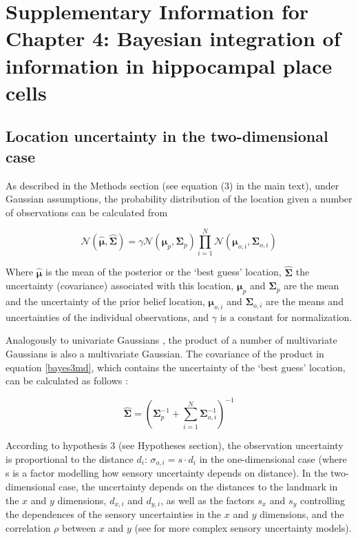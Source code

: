 \chapter{Supplementary Information for Chapter 4: Bayesian integration of information in hippocampal place cells}
\label{apx:bayespc}

\section{Location uncertainty in the two-dimensional case}

As described in the Methods section (see equation (3) in the main text), under Gaussian assumptions, the probability distribution of the location given a number of observations can be calculated from 

\begin{equation}\label{bayes3md}
\mathcal{N}( \hat{ \boldsymbol \mu }, \hat{ \boldsymbol \Sigma } ) = \gamma \mathcal{N}( \boldsymbol \mu_p, \boldsymbol \Sigma_p ) \prod_{i=1}^N { \mathcal{N}( \boldsymbol \mu_{o,i}, \boldsymbol \Sigma_{o,i} ) }
\end{equation}

Where $ \hat{\boldsymbol \mu} $ is the mean of the posterior or the `best guess' location, $\hat{ \boldsymbol \Sigma }$ the uncertainty (covariance) associated with this location, $\boldsymbol \mu_p$ and $\boldsymbol \Sigma_p$ are the mean and the uncertainty of the prior belief location, $ \boldsymbol \mu_{o,i} $ and $ \boldsymbol \Sigma_{o,i} $ are the means and uncertainties of the individual observations, and $ \gamma $ is a constant for normalization. 

Analogously to univariate Gaussians \cite{bromiley2003products}, the product of a number of multivariate Gaussians is also a multivariate Gaussian. The covariance of the product in equation \eqref{bayes3md}, which contains the uncertainty of the `best guess' location, can be calculated as follows \cite{Wu04someproperties}:

\begin{equation}\label{cov1}
\hat { \boldsymbol \Sigma  } =(\boldsymbol \Sigma_p ^{ -1 }+\sum _{ i=1 }^{ N }{ \boldsymbol \Sigma _{ o,i }^{ -1 } } )^{ -1 }
\end{equation}

According to hypothesis 3 (see Hypotheses section), the observation uncertainty is proportional to the distance $ d_i $: $ \sigma_{o,i} = s \cdot d_i $ in the one-dimensional case (where s is a factor modelling how sensory uncertainty depends on distance). In the two-dimensional case, the uncertainty depends on the distances to the landmark in the $ x $ and $ y $ dimensions, $ d_{x, i} $ and $ d_{y, i} $, as well as the factors $ s_x $ and $ s_y $ controlling the dependences of the sensory uncertainties in the $ x $ and $ y $ dimensions, and the correlation $ \rho $ between $x$ and $y$ (see \cite{Negenborn2003, Thrun2005} for more complex sensory uncertainty models).

